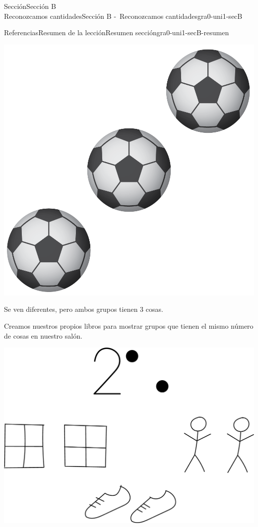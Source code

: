 \begin{sectionptx}{Sección}{{\Large Sección B\\}Reconozcamos cantidades}{}{Sección B -~Reconozcamos cantidades}{}{}{gra0-uni1-secB}
\begin{references-subsection}{Referencias}{Resumen de la lección}{}{Resumen sección}{}{}{gra0-uni1-secB-resumen}
\begin{sidebyside}{2}{0.1}{0.1}{0.2}
\begin{sbspanel}{0.3}
\includegraphics[max width=\linewidth, center]{external/png-source/K.1.C11.BLM.H.png}
\end{sbspanel}%
\end{sidebyside}%
\par
Se ven diferentes, pero ambos grupos tienen 3 cosas.%
\par
Creamos nuestros propios libros para mostrar grupos que tienen el mismo número  de cosas en nuestro salón.%
\begin{image}{0.2}{0.6}{0.2}{}%
\includegraphics[max width=\linewidth, center]{external/png-source/BLM picture books-2.png}
\end{image}%
\end{references-subsection}
\end{sectionptx}
